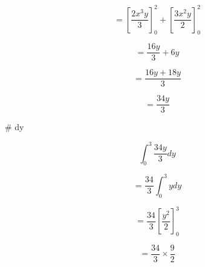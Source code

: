 \documentclass[a4paper,10pt]{article}
\begin{document}
\begin{eulernotebook}
\begin{eulercomment}
\begin{eulercomment}
\begin{eulercomment}
\begin{eulercomment}
\begin{eulercomment}
\begin{eulercomment}
\begin{eulercomment}
\begin{eulercomment}
\begin{eulercomment}
\begin{eulercomment}
\begin{eulercomment}
\begin{eulercomment}
\begin{eulercomment}
\end{eulercomment}
\begin{eulerformula}
\[
= \left [\frac {2x^3y} {3} \right]_0^2 + \left [\frac {3x^2y} {2} \right]_0^2
\]
\end{eulerformula}
\begin{eulercomment}
\end{eulercomment}
\begin{eulerformula}
\[
= \frac {16y} {3} + 6y
\]
\end{eulerformula}
\begin{eulercomment}
\end{eulercomment}
\begin{eulerformula}
\[
= \frac {16y + 18y} {3}
\]
\end{eulerformula}
\begin{eulercomment}
\end{eulercomment}
\begin{eulerformula}
\[
= \frac {34y} {3}
\]
\end{eulerformula}
\begin{eulercomment}
\end{eulercomment}
\begin{eulerttcomment}
     # dy
\end{eulerttcomment}
\begin{eulercomment}
\end{eulercomment}
\begin{eulerformula}
\[
\int_0^3 \frac {34y} {3} dy
\]
\end{eulerformula}
\begin{eulercomment}
\end{eulercomment}
\begin{eulerformula}
\[
= \frac {34} {3} \int_0^3 ydy
\]
\end{eulerformula}
\begin{eulercomment}
\end{eulercomment}
\begin{eulerformula}
\[
= \frac {34} {3} \left[\frac {y^2} {2} \right]_0^3
\]
\end{eulerformula}
\begin{eulercomment}
\end{eulercomment}
\begin{eulerformula}
\[
= \frac {34} {3} \times \frac {9} {2}
\]
\end{eulerformula}
\begin{eulercomment}
\end{eulercomment}

\end{eulercomment}
\end{eulercomment}
\end{eulercomment}
\end{eulercomment}
\end{eulercomment}
\end{eulercomment}
\end{eulercomment}
\end{eulercomment}
\end{eulercomment}
\end{eulercomment}
\end{eulercomment}
\end{eulercomment}
\end{eulernotebook}
\end{document}
